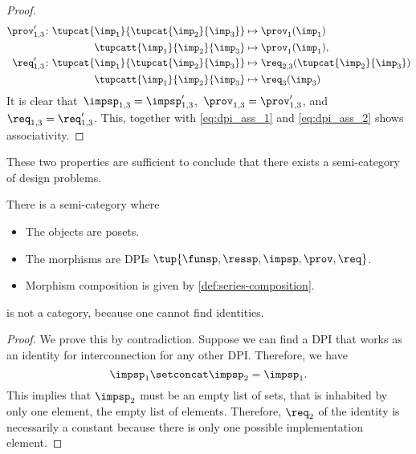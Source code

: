 \begin{proof}
\begin{equation}
\begin{aligned}
            \prov'_{1,3} \colon  \tupcat {\imp_{1}}{\tupcat {\imp_{2}} {\imp_{3}}}   &\mapsto\prov_{1}(\imp_{1})\\
            \tupcatt{\imp_{1}}{\imp_{2}}{\imp_{3}} &\mapsto\prov_{1}(\imp_{1}),\\
            \req'_{1,3} \colon  \tupcat {\imp_{1}}{\tupcat {\imp_{2}} {\imp_{3}}} &\mapsto\req_{2,3}(\tupcat {\imp_{2}} {\imp_{3}})\\
            \tupcatt{\imp_{1}}{\imp_{2}}{\imp_{3}}&\mapsto \req_{3}(\imp_{3})
        \end{aligned}
    \end{equation}
    It is clear that~$\impsp_{1,3}=\impsp'_{1,3}$,~$\prov_{1,3}=\prov'_{1,3}$, and~$\req_{1,3}=\req'_{1,3}$.
    This, together with \cref{eq:dpi_ass_1} and \cref{eq:dpi_ass_2} shows associativity.
\end{proof}

These two properties are sufficient to conclude that there exists a semi-category of design problems.



\begin{definition}
    \label{def:DPIcat}
    There is a semi-category \DPI where
    \begin{itemize}
        \item The objects are posets.
        \item The morphisms are DPIs $\tup{\funsp,\ressp,\impsp,\prov,\req}$.
        \item Morphism composition is given by \cref{def:series-composition}.
    \end{itemize}
\end{definition}

\begin{lemma}
    \DPI is not a category, because one cannot find identities.
\end{lemma}
\begin{proof}
    We prove this by contradiction.
    Suppose we can find a DPI that works as an identity for interconnection for any other DPI.
    Therefore, we have
    \begin{equation}
        \impsp_{1} \setconcat \impsp_{2} = \impsp_{1}.
    \end{equation}
    This implies that $\impsp_{2}$ must be an empty list of sets,  that is inhabited by only one element, the empty list of elements.
    Therefore, $\req_2$ of the identity is necessarily a constant because there is only one possible implementation element.
\end{proof}

